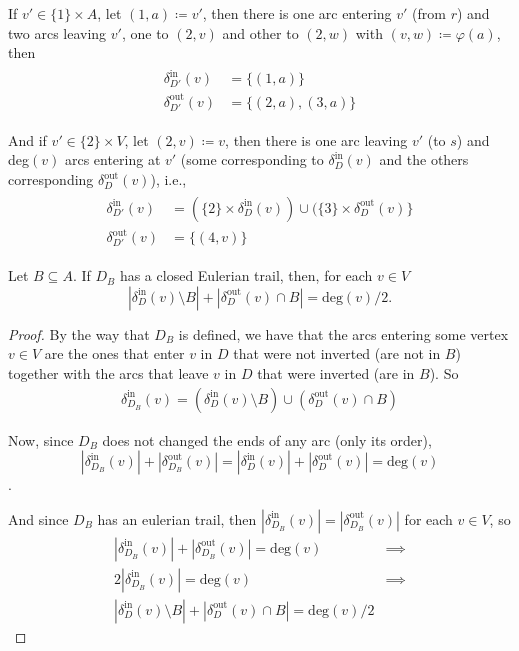\documentclass[a4paper,10pt, leqno]{article}
\theoremstyle{definition}
\begin{document}
If $v' \in \{1\} \times A$, let $(1, a) \coloneqq v'$, then there is one arc entering $v'$ (from $r$) and two arcs leaving $v'$, one to $(2, v)$ and other to $(2, w)$ with $(v, w) \coloneqq \varphi(a)$, then
\begin{align*}
 \tag{2.3}
 \begin{split}
 \delta_{D'}^\text{in}(v) &= \{(1, a)\} \\
 \delta_{D'}^\text{out}(v) &= \{(2, a), (3, a)\}
 \end{split}
\end{align*}

And if $v' \in \{2\} \times V$, let $(2, v) \coloneqq v$, then there is one arc leaving $v'$ (to $s$) and deg$(v)$ arcs entering at $v'$ (some corresponding to  $\delta_{D}^\text{in}(v)$ and the others corresponding $\delta_{D}^\text{out}(v)$), i.e.,
\begin{align*}
 \tag{2.4}
 \begin{split}
 \delta_{D'}^\text{in}(v) &= (\{2\} \times \delta_{D}^\text{in}(v)) \cup (\{3\} \times \delta_{D}^\text{out}(v)\} \\
 \delta_{D'}^\text{out}(v) &=  \{(4, v)\}
 \end{split}
\end{align*}

\begin{proposition}
 Let $B \subseteq A$. If $D_B$ has a closed Eulerian trail, then, for each $v \in V$
 $$|\delta_D^\text{in}(v) \setminus B| + |\delta_D^\text{out}(v) \cap B| = \text{deg}(v)/2.$$
\end{proposition}
\begin{proof}
 By the way that $D_B$ is defined, we have that the arcs entering some vertex $v \in V$ are the ones that enter $v$ in $D$ that were not inverted (are not in $B$) together with the arcs that leave $v$ in $D$ that were inverted (are in $B$). So
 \begin{align*}
  \tag{2.5} \delta_{D_B}^\text{in}(v) = (\delta_D^\text{in}(v) \setminus B) \cup (\delta_D^\text{out}(v) \cap B)
 \end{align*}
 
Now, since $D_B$ does not changed the ends of any arc (only its order), $$|\delta_{D_B}^\text{in}(v)| + |\delta_{D_B}^\text{out}(v)| = |\delta_{D}^\text{in}(v)| + |\delta_{D}^\text{out}(v)| = \text{deg}(v)$$.

And since $D_B$ has an eulerian trail, then $|\delta_{D_B}^\text{in}(v)| = |\delta_{D_B}^\text{out}(v)|$ for each $v \in V$, so 
\begin{align*}
 |\delta_{D_B}^\text{in}(v)| + |\delta_{D_B}^\text{out}(v)| = \text{deg}(v) &\implies \\
 2|\delta_{D_B}^\text{in}(v)| =\text{deg}(v) &\implies \\
 |\delta_D^\text{in}(v) \setminus B| + |\delta_D^\text{out}(v) \cap B| = \text{deg}(v)/2 
\end{align*}
\end{proof}
\end{document}
